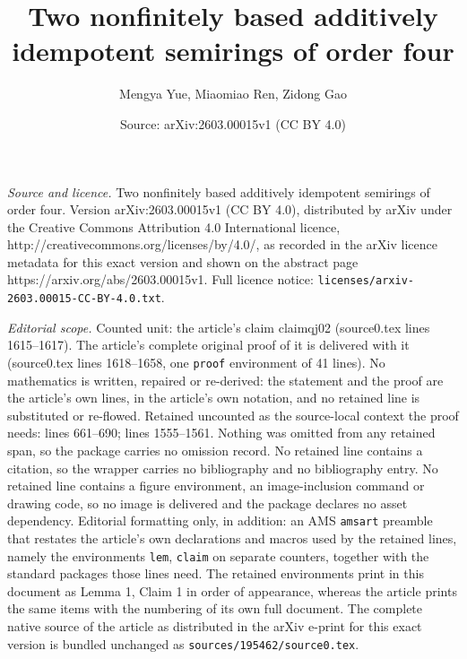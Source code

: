 \documentclass[10pt,a4paper]{amsart}
\title{Two nonfinitely based additively idempotent semirings of order four}
\author{Mengya Yue, Miaomiao Ren, Zidong Gao}
\date{Source: arXiv:2603.00015v1 (CC BY 4.0)}
\begin{document}
\maketitle

\noindent\emph{Source and licence.} Two nonfinitely based additively idempotent semirings of order four. Version arXiv:2603.00015v1 (CC BY 4.0), distributed by arXiv under the Creative Commons Attribution 4.0 International licence, http://creativecommons.org/licenses/by/4.0/, as recorded in the arXiv licence metadata for this exact version and shown on the abstract page https://arxiv.org/abs/2603.00015v1. Full licence notice: \texttt{licenses/arxiv-2603.00015-CC-BY-4.0.txt}.\par\smallskip

\noindent\textit{Editorial scope.} Counted unit: the article's claim claimqj02 (source0.tex lines 1615--1617). The article's complete original proof of it is delivered with it (source0.tex lines 1618--1658, one \texttt{proof} environment of 41 lines). No mathematics is written, repaired or re-derived: the statement and the proof are the article's own lines, in the article's own notation, and no retained line is substituted or re-flowed.  Retained uncounted as the source-local context the proof needs: lines 661--690; lines 1555--1561.  Nothing was omitted from any retained span, so the package carries no omission record.  No retained line contains a citation, so the wrapper carries no bibliography and no bibliography entry.  No retained line contains a figure environment, an image-inclusion command or drawing code, so no image is delivered and the package declares no asset dependency.  Editorial formatting only, in addition: an AMS \texttt{amsart} preamble that restates the article's own declarations and macros used by the retained lines, namely the environments \texttt{lem}, \texttt{claim} on separate counters, together with the standard packages those lines need.  The retained environments print in this document as Lemma 1, Claim 1 in order of appearance, whereas the article prints the same items with the numbering of its own full document.  The complete native source of the article as distributed in the arXiv e-print for this exact version is bundled unchanged as \texttt{sources/195462/source0.tex}.
\end{document}
